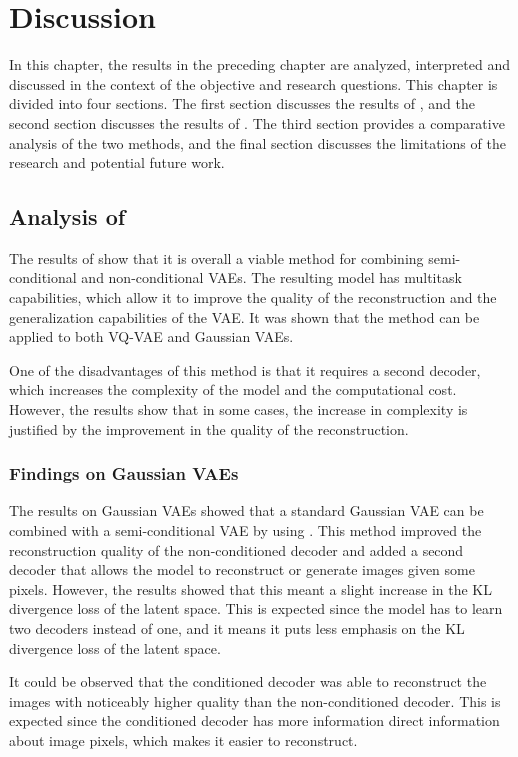 \chapter{Discussion}

In this chapter, the results in the preceding chapter are analyzed, interpreted and discussed in the context of the objective and research questions. This chapter is divided into four sections. The first section discusses the results of , and the second section discusses the results of . The third section provides a comparative analysis of the two methods, and the final section discusses the limitations of the research and potential future work.

\section{Analysis of }

The results of  show that it is overall a viable method for combining semi-conditional and non-conditional VAEs. The resulting model has multitask capabilities, which allow it to improve the quality of the reconstruction and the generalization capabilities of the VAE. It was shown that the method can be applied to both VQ-VAE  and Gaussian VAEs.

One of the disadvantages of this method is that it requires a second decoder, which increases the complexity of the model and the computational cost. However, the results show that in some cases, the increase in complexity is justified by the improvement in the quality of the reconstruction.

\subsection{Findings on Gaussian VAEs}

The results on Gaussian VAEs showed that a standard Gaussian VAE can be combined with a semi-conditional VAE by using . This method improved the reconstruction quality of the non-conditioned decoder and added a second decoder that allows the model to reconstruct or generate images given some pixels. However, the results showed that this meant a slight increase in the KL divergence loss of the latent space. This is expected since the model has to learn two decoders instead of one, and it means it puts less emphasis on the KL divergence loss of the latent space.

It could be observed that the conditioned decoder was able to reconstruct the images with noticeably higher quality than the non-conditioned decoder. This is expected since the conditioned decoder has more information direct information about image pixels, which makes it easier to reconstruct.  

